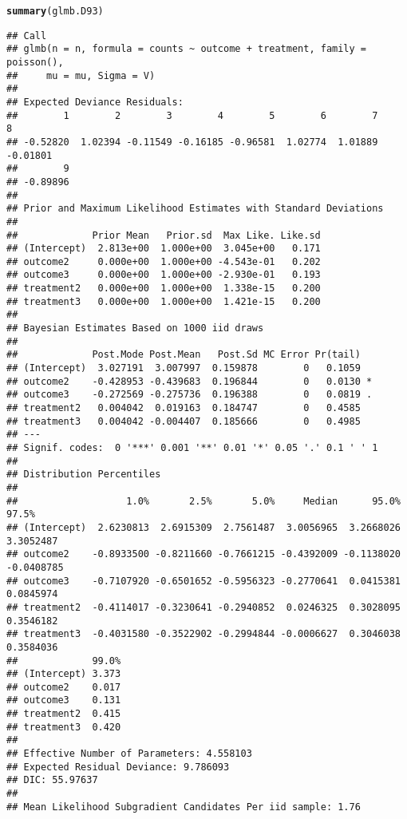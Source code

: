 \documentclass{article}\usepackage[]{graphicx}\usepackage[]{color}
\makeatletter
\newcommand{\hlstd}[1]{\textcolor[rgb]{0.345,0.345,0.345}{#1}}%
\newcommand{\hlkwd}[1]{\textcolor[rgb]{0.737,0.353,0.396}{\textbf{#1}}}%
\newenvironment{kframe}{%
 \def\at@end@of@kframe{}%
 \ifinner\ifhmode%
  \def\at@end@of@kframe{\end{minipage}}%
  \begin{minipage}{\columnwidth}%
 \fi\fi%
 \def\FrameCommand##1{\hskip\@totalleftmargin \hskip-\fboxsep
 \colorbox{shadecolor}{##1}\hskip-\fboxsep
     \hskip-\linewidth \hskip-\@totalleftmargin \hskip\columnwidth}%
 \MakeFramed {\advance\hsize-\width
   \@totalleftmargin\z@ \linewidth\hsize
   \@setminipage}}%
 {\par\unskip\endMakeFramed%
 \at@end@of@kframe}
\newenvironment{knitrout}{}{} %
\makeatother
\begin{document}
\begin{knitrout}
\color{fgcolor}\begin{kframe}
\begin{alltt}
\hlkwd{summary}\hlstd{(glmb.D93)}
\end{alltt}
\begin{verbatim}
## Call
## glmb(n = n, formula = counts ~ outcome + treatment, family = poisson(), 
##     mu = mu, Sigma = V)
## 
## Expected Deviance Residuals:
##        1        2        3        4        5        6        7        8 
## -0.52820  1.02394 -0.11549 -0.16185 -0.96581  1.02774  1.01889 -0.01801 
##        9 
## -0.89896 
## 
## Prior and Maximum Likelihood Estimates with Standard Deviations
## 
##             Prior Mean   Prior.sd  Max Like. Like.sd
## (Intercept)  2.813e+00  1.000e+00  3.045e+00   0.171
## outcome2     0.000e+00  1.000e+00 -4.543e-01   0.202
## outcome3     0.000e+00  1.000e+00 -2.930e-01   0.193
## treatment2   0.000e+00  1.000e+00  1.338e-15   0.200
## treatment3   0.000e+00  1.000e+00  1.421e-15   0.200
## 
## Bayesian Estimates Based on 1000 iid draws
## 
##             Post.Mode Post.Mean   Post.Sd MC Error Pr(tail)  
## (Intercept)  3.027191  3.007997  0.159878        0   0.1059  
## outcome2    -0.428953 -0.439683  0.196844        0   0.0130 *
## outcome3    -0.272569 -0.275736  0.196388        0   0.0819 .
## treatment2   0.004042  0.019163  0.184747        0   0.4585  
## treatment3   0.004042 -0.004407  0.185666        0   0.4985  
## ---
## Signif. codes:  0 '***' 0.001 '**' 0.01 '*' 0.05 '.' 0.1 ' ' 1
## 
## Distribution Percentiles
## 
##                   1.0%       2.5%       5.0%     Median      95.0%      97.5%
## (Intercept)  2.6230813  2.6915309  2.7561487  3.0056965  3.2668026  3.3052487
## outcome2    -0.8933500 -0.8211660 -0.7661215 -0.4392009 -0.1138020 -0.0408785
## outcome3    -0.7107920 -0.6501652 -0.5956323 -0.2770641  0.0415381  0.0845974
## treatment2  -0.4114017 -0.3230641 -0.2940852  0.0246325  0.3028095  0.3546182
## treatment3  -0.4031580 -0.3522902 -0.2994844 -0.0006627  0.3046038  0.3584036
##             99.0%
## (Intercept) 3.373
## outcome2    0.017
## outcome3    0.131
## treatment2  0.415
## treatment3  0.420
## 
## Effective Number of Parameters: 4.558103 
## Expected Residual Deviance: 9.786093 
## DIC: 55.97637 
## 
## Mean Likelihood Subgradient Candidates Per iid sample: 1.76
\end{verbatim}
\end{kframe}
\end{knitrout}
\end{document}
